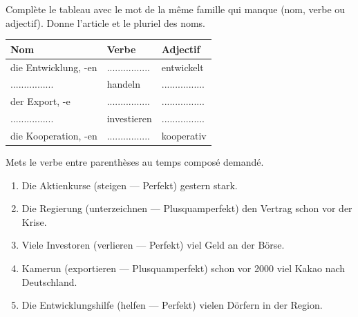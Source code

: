 \documentclass[11pt]{article}
\newcounter{popsec}
\newcounter{popsub}
\newcommand{\courssub}[1]{%
  \stepcounter{popsub}%
  \par\vspace{9pt}\noindent{\popxbold\fontsize{11.5}{13}\selectfont\color{popink}{\color{poporange}\thepopsec.\thepopsub}\hspace{6pt}#1}\par\nopagebreak\vspace{4pt}
}
\begin{document}
\begin{exercice}
Complète le tableau avec le mot de la même famille qui manque (nom, verbe ou adjectif). Donne l'article et le pluriel des noms.

\begin{center}
\begin{tabularx}{\linewidth}{|X|X|X|}
\hline
\rowcolor{popblueL} Nom & Verbe & Adjectif \\
\hline
die Entwicklung, -en & ................ & entwickelt \\
\hline
................ & handeln & ................ \\
\hline
der Export, -e & ................ & ................ \\
\hline
................ & investieren & ................ \\
\hline
die Kooperation, -en & ................ & kooperativ \\
\hline
\end{tabularx}
\end{center}
\end{exercice}

\begin{exercice}
Mets le verbe entre parenthèses au temps composé demandé.

\begin{enumerate}
\item Die Aktienkurse (steigen — Perfekt) gestern stark.
\item Die Regierung (unterzeichnen — Plusquamperfekt) den Vertrag schon vor der Krise.
\item Viele Investoren (verlieren — Perfekt) viel Geld an der Börse.
\item Kamerun (exportieren — Plusquamperfekt) schon vor 2000 viel Kakao nach Deutschland.
\item Die Entwicklungshilfe (helfen — Perfekt) vielen Dörfern in der Region.
\end{enumerate}
\end{exercice}

\courssub{Je m'entraîne}
\end{document}
